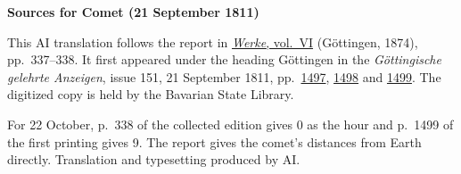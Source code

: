 \clearpage\thispagestyle{empty}
\begin{center}\textbf{Sources for Comet (21 September 1811)}\end{center}
\noindent This AI translation follows the report in \href{https://gdz.sub.uni-goettingen.de/id/PPN236007467}{\textit{Werke}, vol.~VI} (Göttingen, 1874), pp.~337--338. It first appeared under the heading Göttingen in the \textit{Göttingische gelehrte Anzeigen}, issue 151, 21 September 1811, pp.~\href{https://api.digitale-sammlungen.de/iiif/image/v2/bsb10538680_00473/full/1600,/0/default.jpg}{1497}, \href{https://api.digitale-sammlungen.de/iiif/image/v2/bsb10538680_00474/full/1600,/0/default.jpg}{1498} and \href{https://api.digitale-sammlungen.de/iiif/image/v2/bsb10538680_00475/full/1600,/0/default.jpg}{1499}. The digitized copy is held by the Bavarian State Library.
\par\smallskip\noindent For 22 October, p.~338 of the collected edition gives 0 as the hour and p.~1499 of the first printing gives 9. The report gives the comet’s distances from Earth directly. Translation and typesetting produced by AI.
\clearpage
